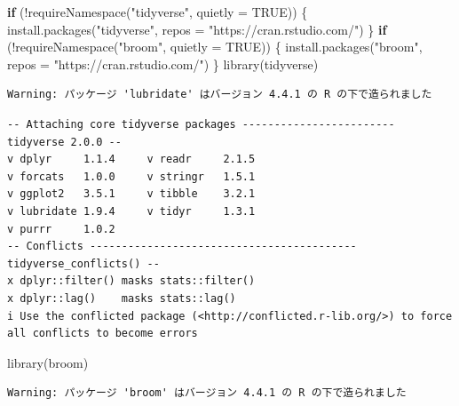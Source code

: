 \documentclass[
  xelatex]{bxjsarticle}
\newenvironment{Shaded}{\begin{snugshade}}{\end{snugshade}}
\newcommand{\AttributeTok}[1]{\textcolor[rgb]{0.40,0.45,0.13}{#1}}
\newcommand{\ConstantTok}[1]{\textcolor[rgb]{0.56,0.35,0.01}{#1}}
\newcommand{\ControlFlowTok}[1]{\textcolor[rgb]{0.00,0.23,0.31}{\textbf{#1}}}
\newcommand{\FunctionTok}[1]{\textcolor[rgb]{0.28,0.35,0.67}{#1}}
\newcommand{\NormalTok}[1]{\textcolor[rgb]{0.00,0.23,0.31}{#1}}
\newcommand{\SpecialCharTok}[1]{\textcolor[rgb]{0.37,0.37,0.37}{#1}}
\newcommand{\StringTok}[1]{\textcolor[rgb]{0.13,0.47,0.30}{#1}}
\begin{document}
\begin{Shaded}
\begin{Highlighting}[]
\ControlFlowTok{if}\NormalTok{ (}\SpecialCharTok{!}\FunctionTok{requireNamespace}\NormalTok{(}\StringTok{"tidyverse"}\NormalTok{, }\AttributeTok{quietly =} \ConstantTok{TRUE}\NormalTok{)) \{}
  \FunctionTok{install.packages}\NormalTok{(}\StringTok{"tidyverse"}\NormalTok{, }\AttributeTok{repos =} \StringTok{"https://cran.rstudio.com/"}\NormalTok{)}
\NormalTok{\}}
\ControlFlowTok{if}\NormalTok{ (}\SpecialCharTok{!}\FunctionTok{requireNamespace}\NormalTok{(}\StringTok{"broom"}\NormalTok{, }\AttributeTok{quietly =} \ConstantTok{TRUE}\NormalTok{)) \{}
  \FunctionTok{install.packages}\NormalTok{(}\StringTok{"broom"}\NormalTok{, }\AttributeTok{repos =} \StringTok{"https://cran.rstudio.com/"}\NormalTok{)}
\NormalTok{\}}
\FunctionTok{library}\NormalTok{(tidyverse)}
\end{Highlighting}
\end{Shaded}

\begin{verbatim}
Warning: パッケージ 'lubridate' はバージョン 4.4.1 の R の下で造られました
\end{verbatim}

\begin{verbatim}
-- Attaching core tidyverse packages ------------------------ tidyverse 2.0.0 --
v dplyr     1.1.4     v readr     2.1.5
v forcats   1.0.0     v stringr   1.5.1
v ggplot2   3.5.1     v tibble    3.2.1
v lubridate 1.9.4     v tidyr     1.3.1
v purrr     1.0.2     
-- Conflicts ------------------------------------------ tidyverse_conflicts() --
x dplyr::filter() masks stats::filter()
x dplyr::lag()    masks stats::lag()
i Use the conflicted package (<http://conflicted.r-lib.org/>) to force all conflicts to become errors
\end{verbatim}

\begin{Shaded}
\begin{Highlighting}[]
\FunctionTok{library}\NormalTok{(broom)}
\end{Highlighting}
\end{Shaded}

\begin{verbatim}
Warning: パッケージ 'broom' はバージョン 4.4.1 の R の下で造られました
\end{verbatim}
\end{document}
